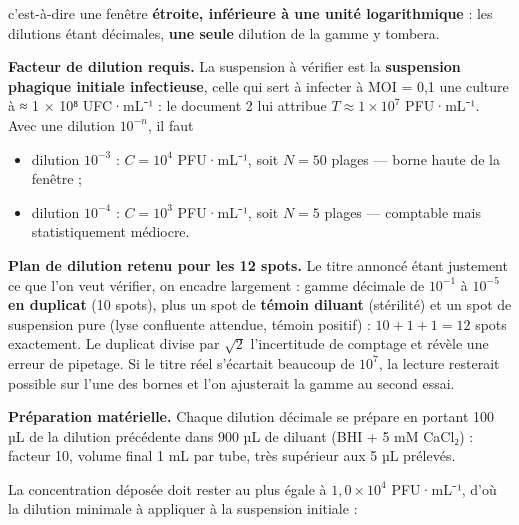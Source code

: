 \documentclass[11pt,a4paper]{article}
\providecommand{\tightlist}{\setlength{\itemsep}{0pt}\setlength{\parskip}{0pt}}
\newcommand{\equationajustee}[1]{%
  \sbox{\boiteequation}{$\displaystyle #1$}%
  \ifdim\wd\boiteequation>\linewidth
    \[\resizebox{\linewidth}{!}{\usebox{\boiteequation}}\]%
  \else
    \[#1\]%
  \fi}
\begin{document}
c'est-à-dire une fenêtre \textbf{étroite, inférieure à une unité logarithmique} : les dilutions étant décimales, \textbf{une seule} dilution de la gamme y tombera.

\textbf{Facteur de dilution requis.} La suspension à vérifier est la \textbf{suspension phagique initiale infectieuse}, celle qui sert à infecter à MOI = 0,1 une culture à ≈ 1 × 10⁸ UFC·mL⁻¹ : le document 2 lui attribue \(T \approx 1\times10^{7}\) PFU·mL⁻¹. Avec une dilution \(10^{-n}\), il faut

\equationajustee{\begin{aligned}
T\times10^{-n} &\le 10^{4} \\
n &\ge \log_{10} T - 4 \\
n &\ge 7 - 4 \\
n &\ge 3
\end{aligned}}

\begin{itemize}
\tightlist
\item
  dilution \(10^{-3}\) : \(C = 10^{4}\) PFU·mL⁻¹, soit \(N = 50\) plages --- borne haute de la fenêtre ;
\item
  dilution \(10^{-4}\) : \(C = 10^{3}\) PFU·mL⁻¹, soit \(N = 5\) plages --- comptable mais statistiquement médiocre.
\end{itemize}

\textbf{Plan de dilution retenu pour les 12 spots.} Le titre annoncé étant justement ce que l'on veut vérifier, on encadre largement : gamme décimale de \(10^{-1}\) à \(10^{-5}\) \textbf{en duplicat} (10 spots), plus un spot de \textbf{témoin diluant} (stérilité) et un spot de suspension pure (lyse confluente attendue, témoin positif) : \(10 + 1 + 1 = 12\) spots exactement. Le duplicat divise par \(\sqrt{2}\) l'incertitude de comptage et révèle une erreur de pipetage. Si le titre réel s'écartait beaucoup de \(10^{7}\), la lecture resterait possible sur l'une des bornes et l'on ajusterait la gamme au second essai.

\textbf{Préparation matérielle.} Chaque dilution décimale se prépare en portant 100 µL de la dilution précédente dans 900 µL de diluant (BHI + 5 mM CaCl₂) : facteur 10, volume final 1 mL par tube, très supérieur aux 5 µL prélevés.

La concentration déposée doit rester au plus égale à \(1{,}0\times10^{4}\) PFU·mL⁻¹, d'où la dilution minimale à appliquer à la suspension initiale :

\equationajustee{\boxed{\text{dilution} \ge 10^{-3}}}
\end{document}
